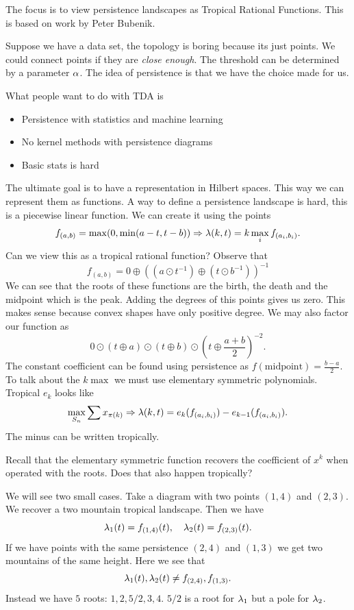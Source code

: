 \documentclass[12pt]{memoir}
\begin{document}
The focus is to view persistence landscapes as Tropical Rational Functions. This is based on work by Peter Bubenik.\par 
Suppose we have a data set, the topology is boring because its just points. We could connect points if they are \emph{close enough}. The threshold can be determined by a parameter $\alpha$. The idea of persistence is that we have the choice made for us.\par 
What people want to do with TDA is
\begin{itemize}
    \item Persistence with statistics and machine learning
    \item No kernel methods with persistence diagrams
    \item Basic stats is hard
\end{itemize}
The ultimate goal is to have a representation in Hilbert spaces. This way we can represent them as functions. A way to define a persistence landscape is hard, this is a piecewise linear function. We can create it using the points 
$$f_{(a,b)}=\max(0,\min(a-t,t-b))\Rightarrow\lambda(k,t)=k\max_if_{(a_i,b_i)}.$$
Can we view this as a tropical rational function? Observe that 
$$f_{(a,b)}=0\oplus((a\odot t^{-1})\oplus(t\odot b^{-1}))^{-1}$$
We can see that the roots of these functions are the birth, the death and the midpoint which is the peak. Adding the degrees of this points gives us zero. This makes sense because convex shapes have only positive degree. We may also factor our function as 
$$0\odot(t\oplus a)\odot(t\oplus b)\odot(t\oplus \frac{a+b}{2})^{-2}.$$
The constant coefficient can be found using persistence as $f(\text{midpoint})=\frac{b-a}{2}$. To talk about the $k\max$ we must use elementary symmetric polynomials. Tropical $e_k$ looks like 
$$\max_{S_n}\sum x_{\pi(k)}\Rightarrow \lambda(k,t)=e_k(f_{(a_i,b_i)})-e_{k-1}(f_{(a_i,b_i)}).$$
The minus can be written tropically.

\begin{significant}
    Recall that the elementary symmetric function recovers the coefficient of $x^k$ when operated with the roots. Does that also happen tropically?
\end{significant}

\begin{Ex}
    We will see two small cases. Take a diagram with two points $(1,4)$ and $(2,3)$. We recover a two mountain tropical landscape. Then we have 
    $$\lambda_1(t)=f_{(1,4)}(t),\quad\lambda_2(t)=f_{(2,3)}(t).$$
    If we have points with the same persistence $(2,4)$ and $(1,3)$ we get two mountains of the same height. Here we see that 
    $$\lambda_1(t),\lambda_2(t)\neq f_{(2,4)},f_{(1,3)}.$$
    Instead we have $5$ roots: $1,2,5/2,3,4$. $5/2$ is a root for $\lambda_1$ but a pole for $\lambda_2$.
\end{Ex}
\end{document}
